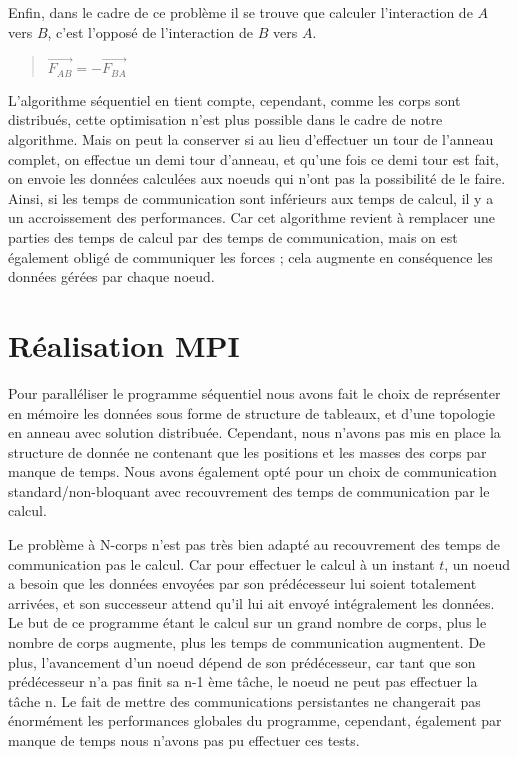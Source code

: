 \par Enfin, dans le cadre de ce problème il se trouve que calculer l'interaction de $A$
vers $B$, c'est l'opposé de l'interaction de $B$ vers $A$.

\begin{quote}
  \begin{center}
    $ \overrightarrow{F_{AB}} = -\overrightarrow{F_{BA}} $
  \end{center}
\end{quote}

\par L'algorithme séquentiel en tient compte, cependant, comme les corps sont distribués,
cette optimisation n'est plus possible dans le cadre de notre algorithme.
Mais on peut la conserver si au lieu d'effectuer un tour de l'anneau complet, on effectue
un demi tour d'anneau, et qu'une fois ce demi tour est fait, on envoie les données calculées 
aux noeuds qui n'ont pas la possibilité de le faire. Ainsi, si les temps de communication
sont inférieurs aux temps de calcul, il y a un accroissement des performances. Car 
cet algorithme revient à remplacer une parties des temps de calcul par des temps de communication, 
mais on est également obligé de communiquer les forces ; cela augmente en conséquence 
les données gérées par chaque noeud.\\

\section{Réalisation MPI}

\par Pour paralléliser le programme séquentiel nous avons fait le choix de représenter
en mémoire les données sous forme de structure de tableaux, et d'une topologie en anneau avec
solution distribuée.
Cependant, nous n'avons pas mis en place la structure de donnée ne contenant que les 
positions et les masses des corps par manque de temps. Nous avons également opté pour un 
choix de communication standard/non-bloquant avec recouvrement des temps de
communication par le calcul.\\

\par Le problème à N-corps n'est pas très bien adapté au recouvrement des temps de 
communication pas le calcul. Car pour effectuer le calcul à un instant $t$, un noeud a 
besoin que les données envoyées par son prédécesseur lui soient totalement arrivées, 
et son successeur attend qu'il lui ait envoyé intégralement les données. Le but de ce programme 
étant le calcul sur un grand nombre de corps, plus le nombre de corps augmente, plus les temps de 
communication augmentent. De plus, l'avancement d'un noeud dépend de son prédécesseur, car tant que 
son prédécesseur n'a pas finit sa n-1 ème tâche, le noeud ne peut pas effectuer la tâche n.
Le fait de mettre des communications persistantes ne changerait pas énormément les performances
globales du programme, cependant, également par manque de temps nous n'avons pas pu effectuer 
ces tests.\\

